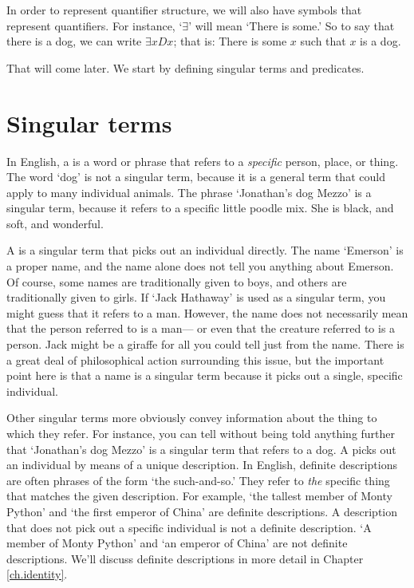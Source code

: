 In order to represent quantifier structure, we will also have symbols that represent quantifiers. For instance, `$\exists$' will mean `There is some\blank.' So to say that there is a dog, we can write $\exists x Dx$; that is: There is some $x$ such that $x$ is a dog.

That will come later. We start by defining singular terms and predicates.


\section{Singular terms}
In English, a  is a word or phrase that refers to a \emph{specific} person, place, or thing. The word `dog' is not a singular term, because it is a general term that could apply to many individual animals. The phrase `Jonathan's dog Mezzo' is a singular term, because it refers to a specific little poodle mix. She is black, and soft, and wonderful.

A  is a singular term that picks out an individual directly. The name `Emerson' is a proper name, and the name alone does not tell you anything about Emerson. Of course, some names are traditionally given to boys, and others are traditionally given to girls. If `Jack Hathaway' is used as a singular term, you might guess that it refers to a man. However, the name does not necessarily mean that the person referred to is a man--- or even that the creature referred to is a person. Jack might be a giraffe for all you could tell just from the name. There is a great deal of philosophical action surrounding this issue, but the important point here is that a name is a singular term because it picks out a single, specific individual.

Other singular terms more obviously convey information about the thing to which they refer. For instance, you can tell without being told anything further that `Jonathan's dog Mezzo' is a singular term that refers to a dog. A  picks out an individual by means of a unique description. In English, definite descriptions are often phrases of the form `the such-and-so.' They refer to \emph{the} specific thing that matches the given description. For example, `the tallest member of Monty Python' and `the first emperor of China' are definite descriptions. A description that does not pick out a specific individual is not a definite description. `A member of Monty Python' and `an emperor of China' are not definite descriptions. We'll discuss definite descriptions in more detail in Chapter \ref{ch.identity}.

